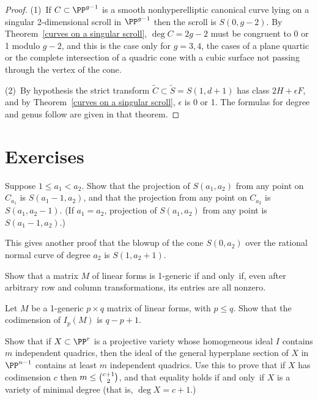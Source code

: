 \begin{proof} (1)\, If $C\subset \PP^{g-1}$ is a smooth nonhyperelliptic
canonical curve lying on a singular 2-dimensional scroll in $\PP^{g-1}$
then the scroll is $S(0, g-2)$. By Theorem~\ref{curves on a singular
scroll}, $\deg C = 2g-2$ must be congruent
to 0 or 1 modulo $g-2$, and this is the case only for $g=3,4$, the cases
of a plane quartic or the complete intersection
of a quadric cone with a cubic surface not passing through the vertex
of the cone.

\noindent
(2)\, By hypothesis the 
strict transform
%
$\tilde C\subset  \tilde S = S(1, d+1)$
has class $2H+\epsilon F$,  and by Theorem~\ref{curves on a singular
scroll}, $\epsilon$ is 0 or 1.
The formulas for degree and genus follow are given in that theorem.
\end{proof}

\section{Exercises}

\begin{exercise}\label{special projections}
Suppose $1\leq a_1 < a_2$. Show that the projection of $S(a_1,a_2)$
from any point on $C_{a_1}$ is
$S(a_1-1, a_2)$, and that the projection from any point on $C_{a_2}$
is $S(a_1, a_2-1)$. (If $a_1 = a_2$, projection of $S(a_1,a_2)$ from
any point is $S(a_1-1, a_2)$.)

This gives another proof that the blowup of the cone $S(0,a_2)$ over
the rational normal curve of degree $a_2$ is $S(1,a_2+1)$.
\end{exercise}

\begin{exercise}
Show that a matrix $M$ of linear forms is 1-generic if and only~if,
even after arbitrary row and column transformations, its entries are
all nonzero.
\end{exercise}

\begin{exercise}
Let $M$ be a 1-generic $p\times q$ matrix of linear forms, with $p\leq
q$. Show that the codimension of
$I_p(M)$ is $q-p+1$. 
\end{exercise}

\begin{exercise}
Show that if $X\subset \PP^r$ is a projective variety whose homogeneous
ideal $I$ contains $m$ independent quadrics, then the ideal of the
general hyperplane section of $X$ in $\PP^{n-1}$
contains at least $m$ independent quadrics. Use this to prove that if $X$
has codimension $c$ then $m\leq \tbinom{c+1}{2}$, and that equality holds
if and only~if
$X$ is a variety of minimal degree (that is, $\deg X = c+1$.)
\end{exercise}

